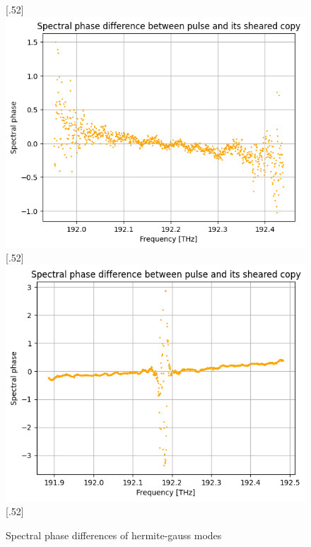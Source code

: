 \documentclass{article}
\begin{document}
\begin{figure}[H]

\caption{Spectral phase differences of hermite-gauss modes}
[.52\linewidth]{%
\includegraphics[width=\linewidth]{hg_diff_1}%
}
\vfill
{}[.52\linewidth]{%
\includegraphics[width=\linewidth]{hg_diff_3}%
}
\vfill
{}[.52\linewidth]{%
}
\end{figure}
\end{document}
